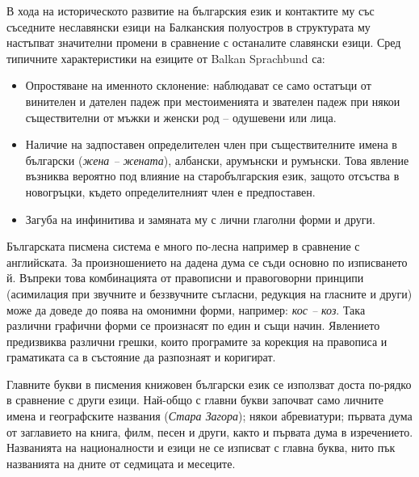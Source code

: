 \documentclass[]{../../metanetpaper}
\begin{document}
\begin{multicols}{2}
В хода на историческото развитие на българския език и
 контактите му със съседните неславянски езици на Балканския полуостров в структурата му настъпват значителни промени в сравнение с останалите славянски
 езици. Сред типичните характеристики на езиците от
 Balkan Sprachbund са:

\begin{itemize}
\item Опростяване на именното склонение: наблюдават се
 само остатъци от винителен и дателен падеж при
 местоименията и звателен падеж при някои съществителни от мъжки и женски род – одушевени
 или лица.

\item Наличие на задпоставен определителен член при съществителните имена в български ({\it жена – жената}),
 албански, арумънски и румънски. Това явление възниква вероятно под влияние на старобългарския език,
 защото отсъства в новогръцки, където определителният член е предпоставен.

\item Загуба на инфинитива и замяната му с лични
глаголни форми и други. 
\end{itemize}


Българската писмена система е много по-лесна
например в сравнение с
 английската.
 За произношението на дадена дума се съди основно по изписването
 й. Въпреки това комбинацията от правописни и
 правоговорни принципи (асимилация при звучните и
 беззвучните съгласни, редукция на гласните и други)
 може да доведе до поява на омонимни форми, например:
\textit{кос -- коз}. Така различни графични форми се произнасят
 по един и същи начин. Явлението предизвиква различни
 грешки, които програмите за корекция на правописа и
граматиката са в състояние да разпознаят и коригират.

Главните букви в писмения книжовен български език се използват доста по-рядко в сравнение с други езици. Най-общо с главни букви започват само личните имена и географските названия
 ({\it Стара Загора}); някои абревиатури; първата дума от
 заглавието на книга, филм, песен и други, както и първата дума в 
изречението. Названията на
 националности и езици не се изписват с главна буква,
 нито пък названията на дните от
 седмицата и месеците.



\end{multicols}
\end{document}
